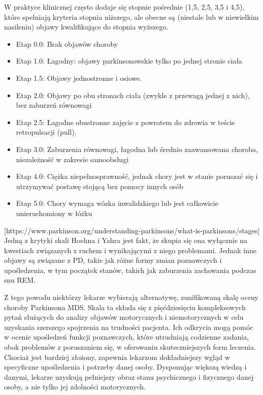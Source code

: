 W praktyce klinicznej często dodaje się stopnie pośrednie (1,5, 2,5, 3,5 i 4,5), które spełniają kryteria stopnia niższego, ale obecne są (niestale lub w niewielkim nasileniu) objawy kwalifikujące do stopnia wyższego.

\begin{itemize}[itemsep=0.5pt]
	\item Etap 0.0: Brak objawów choroby
	\item Etap 1.0: Łagodny: objawy parkinsonowskie tylko po jednej stronie ciała
	\item Etap 1.5: Objawy jednostronne i osiowe.
	\item Etap 2.0: Objawy po obu stronach ciała (zwykle z przewagą jednej z nich), bez zaburzeń równowagi
	\item Etap 2.5: Łagodne obustronne zajęcie z powrotem do zdrowia w teście retropulsacji (pull).
	\item Etap 3.0: Zaburzenia równowagi, łagodna lub średnio zaawansowana choroba, niezależność w zakresie samoobsługi
	\item Etap 4.0: Ciężka niepełnosprawność, jednak chory jest w stanie poruszać się i utrzymywać postawę stojącą bez pomocy innych osób
	\item Etap 5.0: Chory wymaga wózka inwalidzkiego lub jest całkowicie unieruchomiony w łóżku
\end{itemize}

[https://www.parkinson.org/understanding-parkinsons/what-is-parkinsons/stages]
Jedną z krytyki skali Hoehna i Yahra jest fakt, że skupia się ona wyłącznie na kwestiach związanych z ruchem i wynikającymi z niego problemami. Jednak inne objawy są związane z PD, takie jak różne formy zmian poznawczych i upośledzenia, w tym początek stanów, takich jak zaburzenia zachowania podczas snu REM.

Z tego powodu niektórzy lekarze wybierają alternatywę, zunifikowaną skalę oceny choroby Parkinsona MDS. Skala ta składa się z pięćdziesięciu kompleksowych pytań służących do analizy objawów motorycznych i niemotorycznych w celu uzyskania szerszego spojrzenia na trudności pacjenta.
Ich odkrycia mogą pomóc w ocenie upośledzeń funkcji poznawczych, które utrudniają codzienne zadania, obok problemów z poruszaniem się, w oferowaniu skuteczniejszych form leczenia.
Chociaż jest bardziej złożony, zapewnia lekarzom dokładniejszy wgląd w specyficzne upośledzenia i potrzeby danej osoby. Dysponując większą wiedzą i danymi, lekarze uzyskują pełniejszy obraz stanu psychicznego i fizycznego danej osoby, a nie tylko jej zdolności motorycznych.

